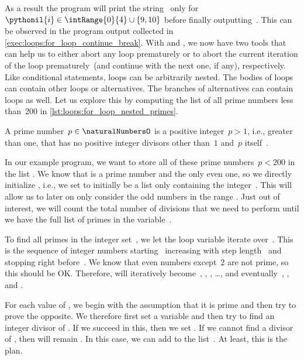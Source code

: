 As a result the program will print the string~ only for~$\pythonil{i}\in\intRange{0}{4}\cup\{9, 10\}$ before finally outputting~.
This can be observed in the program output collected in \cref{exec:loops:for_loop_continue_break}.
With  and , we now have two tools that can help us to either abort any loop prematurely or to abort the current iteration of the loop prematurely~(and continue with the next one, if any), respectively.%
%
\FloatBarrier%
\endhsection%
%
%
%
%
%
%
Like conditional statements, loops can be arbitrarily nested.
The bodies of loops can contain other loops or alternatives.
The branches of alternatives can contain loops as well.
Let us explore this by computing the list of all prime numbers less than~200 in \cref{lst:loops:for_loop_nested_primes}.%
%
\begin{definition}%
A prime number~$p\in\naturalNumbersO$ is a positive integer~$p>1$, i.e., greater than one, that has no positive integer divisors other than~$1$ and~$p$ itself~\cite{W2024MAWWR:PN,CP2005PNACP,R1994PNACMFF}.%
\end{definition}%
%
In our example program, we want to store all of these prime numbers~$p<200$ in the list .
We know that  is a prime number and the only even one, so we directly initialize , i.e., we set  to initially be a list only containing the integer~.
This will allow us to later on only consider the odd numbers in the range .
Just out of interest, we will count the total number of divisions that we need to perform until we have the full list of primes in the variable~.%
%
\begin{sloppypar}%
To find all primes in the integer set~, we let the loop variable  iterate over~.
This is the sequence of integer numbers starting~ increasing with step length~ and stopping right before~.
We know that even numbers except~2 are not prime, so this should be OK.
Therefore,  will iteratively become~, , , \dots, and eventually~, , and .%
\end{sloppypar}%
%
For each value of , we begin with the assumption that it is prime and then try to prove the opposite.
We therefore first set a variable  and then try to find an integer divisor of .
If we succeed in this, then we set .
If we cannot find a divisor of , then  will remain .
In this case, we can add  to the list~.
At least, this is the plan.

